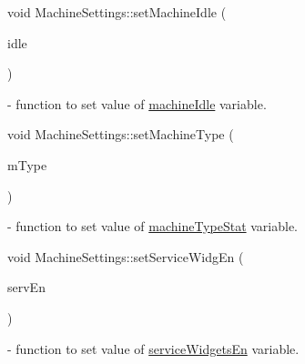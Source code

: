 \mbox{\label{classMachineSettings_a81d10b1a8eef770d08c22df5796dbd8b}} 
{\footnotesize\ttfamily void Machine\+Settings\+::\texorpdfstring{set\+Machine\+Idle}{setMachineIdle} (\begin{DoxyParamCaption}\item[{bool}]{idle }\end{DoxyParamCaption}){\ttfamily [static]}} - function to set value of \hyperlink{classMachineSettings_a8297d5ccf01292708bc4aae65180a54c}{machine\+Idle} variable.

\mbox{\label{classMachineSettings_aba8aeb52eef51e98eedb65a52d22ab0f}} 
{\footnotesize\ttfamily void Machine\+Settings\+::\texorpdfstring{set\+Machine\+Type}{setMachineType} (\begin{DoxyParamCaption}\item[{\mbox{\hyperlink{classMachineSettings_af95330ff3a80de06fe956f5297ec0fc5}{Machine\+Settings\+::\+Machine\+Type}}}]{m\+Type }\end{DoxyParamCaption}){\ttfamily [static]}} - function to set value of \hyperlink{classMachineSettings_ae3167629c7a8723b123ff5616fb284af}{machine\+Type\+Stat} variable.

\mbox{\label{classMachineSettings_a849f1eefa33684d98531d4052b9923e1}} 
{\footnotesize\ttfamily void Machine\+Settings\+::\texorpdfstring{set\+Service\+Widg\+En}{setServiceWidgEn} (\begin{DoxyParamCaption}\item[{bool}]{serv\+En }\end{DoxyParamCaption}){\ttfamily [static]}} - function to set value of \hyperlink{classMachineSettings_a9a8e6bc0e09fa8ac8e32e30cbbd5ef4c}{service\+Widgets\+En} variable.




